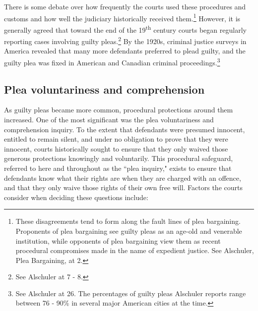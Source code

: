 There is some debate over how frequently the courts used these procedures and customs and how well the judiciary historically received them.\footnote{These disagreements tend to form along the fault lines of plea bargaining. Proponents of plea bargaining see guilty pleas as an age-old and venerable institution, while opponents of plea bargaining view them as recent procedural compromises made in the name of expedient justice. See Alschuler, Plea Bargaining, at 2.} However, it is generally agreed that toward the end of the 19\textsuperscript{th} century courts began regularly reporting cases involving guilty pleas.\footnote{See Alschuler at 7 - 8.} By the 1920s, criminal justice surveys in America revealed that many more defendants preferred to plead guilty, and the guilty plea was fixed in American and Canadian criminal proceedings.\footnote{See Alschuler at 26. The percentages of guilty pleas Alschuler reports range between 76 - 90\% in several major American cities at the time.}

\subsection{Plea voluntariness and comprehension}

As guilty pleas became more common, procedural protections around them increased. One of the most significant was the plea voluntariness and comprehension inquiry. To the extent that defendants were presumed innocent, entitled to remain silent, and under no obligation to prove that they were innocent, courts historically sought to ensure that they only waived those generous protections knowingly and voluntarily. This procedural safeguard, referred to here and throughout as the ``plea inquiry," exists to ensure that defendants know what their rights are when they are charged with an offence, and that they only waive those rights of their own free will. Factors the courts consider when deciding these questions include:

